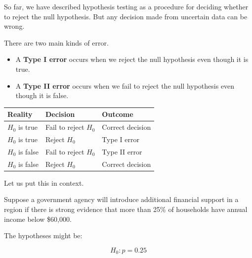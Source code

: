 \documentclass[
  letterpaper,
  DIV=11,
  numbers=noendperiod]{scrreprt}
\providecommand{\tightlist}{%
  \setlength{\itemsep}{0pt}\setlength{\parskip}{0pt}}
\begin{document}
So far, we have described hypothesis testing as a procedure for deciding
whether to reject the null hypothesis. But any decision made from
uncertain data can be wrong.

There are two main kinds of error.

\begin{itemize}
\tightlist
\item
  A \textbf{Type I error} occurs when we reject the null hypothesis even
  though it is true.
\item
  A \textbf{Type II error} occurs when we fail to reject the null
  hypothesis even though it is false.
\end{itemize}

\begin{table}
\fontsize{12.0pt}{14.0pt}\selectfont
\begin{tabular*}{\linewidth}{@{\extracolsep{\fill}}lll}
\toprule
Reality & Decision & Outcome \\ 
\midrule\addlinespace[2.5pt]
\(H_0\) is true & Fail to reject \(H_0\) & Correct decision \\ 
\(H_0\) is true & Reject \(H_0\) & Type I error \\ 
\(H_0\) is false & Fail to reject \(H_0\) & Type II error \\ 
\(H_0\) is false & Reject \(H_0\) & Correct decision \\ 
\bottomrule
\end{tabular*}
\end{table}

Let us put this in context.

\begin{tcolorbox}[enhanced jigsaw, arc=.35mm, bottomrule=.15mm, bottomtitle=1mm, breakable, colback=white, colbacktitle=quarto-callout-note-color!10!white, colframe=quarto-callout-note-color-frame, coltitle=black, left=2mm, leftrule=.75mm, opacityback=0, opacitybacktitle=0.6, rightrule=.15mm, title=\textcolor{quarto-callout-note-color}{\faInfo}\hspace{0.5em}{A policy threshold}, titlerule=0mm, toprule=.15mm, toptitle=1mm]

Suppose a government agency will introduce additional financial support
in a region if there is strong evidence that more than 25\% of
households have annual income below \$60,000.

\end{tcolorbox}

The hypotheses might be:

\[
H_0: p = 0.25
\]
\end{document}
